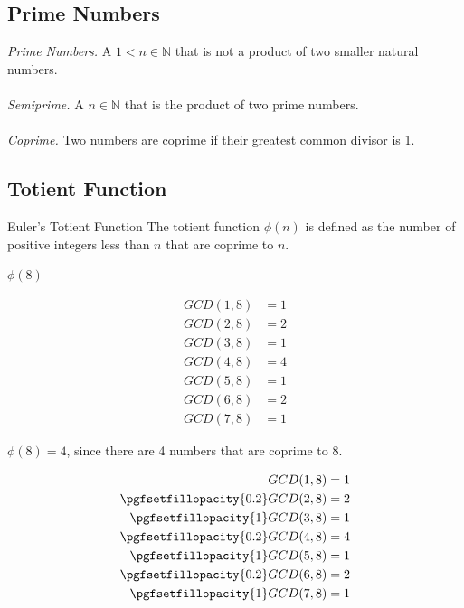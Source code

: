 \documentclass{beamer}
\begin{document}
\subsection{Prime Numbers}
\begin{frame}
	\emph{Prime Numbers. }
	A $1 < n \in \mathbb{N}$ that is not a product of two smaller natural numbers.\\
	~\\

	\emph{Semiprime. }
	A $n \in \mathbb{N}$ that is the product of two prime numbers.\\
	~\\

	\emph{Coprime. }
	Two numbers are coprime if their greatest common divisor is 1.
\end{frame}


\subsection{Totient Function}

\begin{frame}
	\begin{block}{Euler's Totient Function}
		The totient function $\phi(n)$ is defined as the number of positive integers less than $n$ that are coprime to $n$.
	\end{block}

\end{frame}

\begin{frame}
	\begin{center}$\phi(8)$\end{center}
	\begin{align*}
		GCD(1, 8) & = 1 \\
		GCD(2, 8) & = 2 \\
		GCD(3, 8) & = 1 \\
		GCD(4, 8) & = 4 \\
		GCD(5, 8) & = 1 \\
		GCD(6, 8) & = 2 \\
		GCD(7, 8) & = 1
	\end{align*}
\end{frame}

\begin{frame}
	\begin{center}$\phi(8) = 4$, since there are 4 numbers that are coprime to 8.\end{center}
	\begin{align*}
		GCD(1, 8) & = 1 \\
		\pgfsetfillopacity{0.2}
		GCD(2, 8) & = 2 \\
		\pgfsetfillopacity{1}
		GCD(3, 8) & = 1 \\
		\pgfsetfillopacity{0.2}
		GCD(4, 8) & = 4 \\
		\pgfsetfillopacity{1}
		GCD(5, 8) & = 1 \\
		\pgfsetfillopacity{0.2}
		GCD(6, 8) & = 2 \\
		\pgfsetfillopacity{1}
		GCD(7, 8) & = 1
	\end{align*}
\end{frame}
\end{document}
